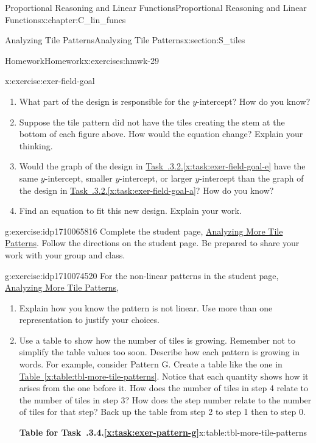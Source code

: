 \documentclass[oneside,10pt,]{book}
\newcommand{\xreffont}{\relax}
\numberwithin{equation}{chapter}
\begin{document}
\begin{chapterptx}{Proportional Reasoning and Linear Functions}{}{Proportional Reasoning and Linear Functions}{}{}{x:chapter:C_lin_funcs}
\begin{sectionptx}{Analyzing Tile Patterns}{}{Analyzing Tile Patterns}{}{}{x:section:S_tiles}
\begin{exercises-subsection}{Homework}{}{Homework}{}{}{x:exercises:hmwk-29}
\begin{divisionexercise}{2}{}{}{x:exercise:exer-field-goal}
\begin{enumerate}[font=\bfseries,label=(\alph*),ref=\alph*]
\item{}What part of the design is responsible for the \(y\)-intercept? How do you know?%
\item\label{x:task:exer-field-goal-e}Suppose the tile pattern did not have the tiles creating the stem at the bottom of each figure above. How would the equation change? Explain your thinking.%
\item{}Would the graph of the design in \hyperref[x:task:exer-field-goal-e]{Task~{\xreffont 2.9.3.2}.{\xreffont\ref{x:task:exer-field-goal-e}}} have the same \(y\)-intercept, smaller \(y\)-intercept, or larger \(y\)-intercept than the graph of the design in \hyperref[x:task:exer-field-goal-a]{Task~{\xreffont 2.9.3.2}.{\xreffont\ref{x:task:exer-field-goal-a}}}? How do you know?%
\item{}Find an equation to fit this new design. Explain your work.%
\end{enumerate}
\end{divisionexercise}%
\begin{divisionexercise}{3}{}{}{g:exercise:idp1710065816}%
Complete the student page, \hyperref[x:worksheet:act-analyze-more-tiles]{Analyzing More Tile Patterns}. Follow the directions on the student page. Be prepared to share your work with your group and class.%
\end{divisionexercise}%
\begin{divisionexercise}{4}{}{}{g:exercise:idp1710074520}%
For the non-linear patterns in the student page, \hyperref[x:worksheet:act-analyze-more-tiles]{Analyzing More Tile Patterns},%
\begin{enumerate}[font=\bfseries,label=(\alph*),ref=\alph*]
\item{}Explain how you know the pattern is not linear. Use more than one representation to justify your choices.%
\item\label{x:task:exer-pattern-g}Use a table to show how the number of tiles is growing. Remember not to simplify the table values too soon. Describe how each pattern is growing in words. For example, consider Pattern G. Create a table like the one in \hyperref[x:table:tbl-more-tile-patterns]{Table~{\xreffont\ref{x:table:tbl-more-tile-patterns}}}. Notice that each quantity shows how it arises from the one before it. How does the number of tiles in step 4 relate to the number of tiles in step 3? How does the step number relate to the number of tiles for that step?  Back up the table from step 2 to step 1 then to step 0.%
\begin{tableptx}{\textbf{Table for Task~{\xreffont 2.9.3.4}.{\xreffont\ref*{x:task:exer-pattern-g}}}}{x:table:tbl-more-tile-patterns}{}%

\end{tableptx}
\end{enumerate}
\end{divisionexercise}
\end{exercises-subsection}
\end{sectionptx}
\end{chapterptx}
\end{document}
